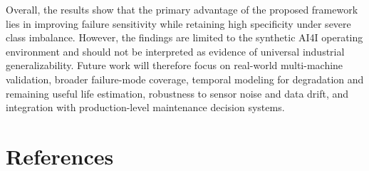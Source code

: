 \documentclass[final,5p, twocolumn]{elsarticle}
\begin{document}
Overall, the results show that the primary advantage of the proposed framework lies in improving failure sensitivity while retaining high specificity under severe class imbalance. However, the findings are limited to the synthetic AI4I operating environment and should not be interpreted as evidence of universal industrial generalizability. Future work will therefore focus on real-world multi-machine validation, broader failure-mode coverage, temporal modeling for degradation and remaining useful life estimation, robustness to sensor noise and data drift, and integration with production-level maintenance decision systems.

\color{black}

\section{References}


\balance


\end{document}
